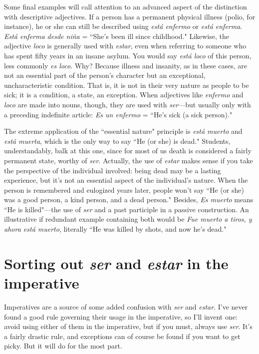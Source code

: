 Some final examples will call attention to an advanced aspect
of the distinction with descriptive adjectives. If a person has a permanent physical illness (polio, for instance), he or she can still be described using \emph{está enfermo} or \emph{está enferma}. \emph{Está enferma desde niña} =
``She's been ill since childhood." Likewise, the adjective \emph{loco} is generally used with \emph{estar}, even when referring to someone who has spent
fifty years in an insane asylum. You would say \emph{está loco} of this person,
less commonly \emph{es loco}. Why? Because illness and insanity, as in these
cases, are not an essential part of the person's character but an exceptional, uncharacteristic condition. That is, it is not in their very nature
as people to be sick; it is a condition, a state, an exception. When adjectives like \emph{enfermo} and \emph{loco} are made into nouns, though, they are
used with \emph{ser}---but usually only with a preceding indefinite article: \emph{Es
un enfermo} = ``He's sick (a sick person)."

The extreme application of the ``essential nature" principle is
\emph{está muerto} and \emph{está muerta}, which is the only way to say ``He (or
she) is dead." Students, understandably, balk at this one, since for most
of us death is considered a fairly permanent state, worthy of \emph{ser}. Actually, the use of \emph{estar} makes sense if you take the perspective of the
individual involved: being dead may be a lasting experience, but it's
not an essential aspect of the individual's nature. When the person is
remembered and eulogized years later, people won't say ``He (or she)
was a good person, a kind person, and a dead person." Besides, \emph{Es
muerto} means ``He is killed"---the use of \emph{ser} and a past participle in a
passive construction. An illustrative if redundant example containing
both would be \emph{Fue muerto a tiros, y ahora está muerto}, literally ``He
was killed by shots, and now he's dead."

\section{Sorting out \emph{ser} and \emph{estar} in the imperative}

Imperatives are a source of some added confusion with \emph{ser} and
\emph{estar}. I've never found a good rule governing their usage in the imperative, so I'll invent one: avoid using either of them in the imperative,
but if you must, always use \emph{ser}. It's a fairly drastic rule, and exceptions
can of course be found if you want to get picky. But it will do for the
most part.

